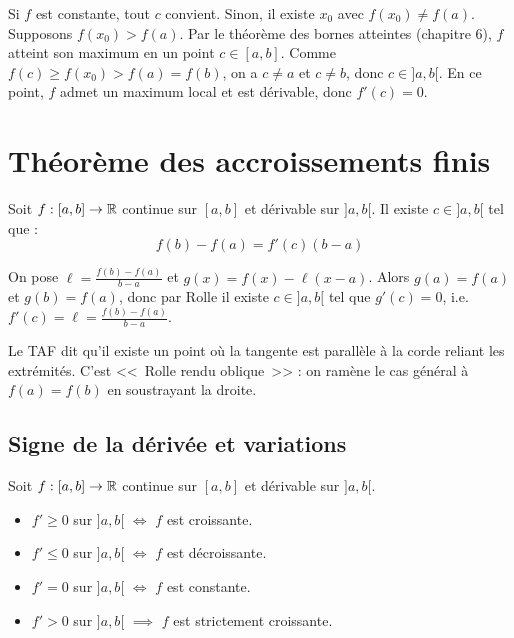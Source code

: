 \begin{proofbox}
Si $f$ est constante, tout $c$ convient. Sinon, il existe $x_0$ avec $f(x_0) \neq f(a)$. Supposons $f(x_0) > f(a)$. Par le théorème des bornes atteintes (chapitre 6), $f$ atteint son maximum en un point $c \in [a, b]$. Comme $f(c) \geqslant f(x_0) > f(a) = f(b)$, on a $c \neq a$ et $c \neq b$, donc $c \in ]a, b[$. En ce point, $f$ admet un maximum local et est dérivable, donc $f'(c) = 0$.
\end{proofbox}


\section{Théorème des accroissements finis}

\begin{thmbox}
Soit $f : [a, b] \to \mathbb{R}$ continue sur $[a, b]$ et dérivable sur $]a, b[$. Il existe $c \in ]a, b[$ tel que :
\[f(b) - f(a) = f'(c)(b - a)\]
\end{thmbox}

\begin{proofbox}
On pose $\ell = \frac{f(b) - f(a)}{b - a}$ et $g(x) = f(x) - \ell(x - a)$. Alors $g(a) = f(a)$ et $g(b) = f(a)$, donc par Rolle il existe $c \in ]a, b[$ tel que $g'(c) = 0$, i.e. $f'(c) = \ell = \frac{f(b) - f(a)}{b - a}$.
\end{proofbox}

\begin{intuitionbox}
Le TAF dit qu'il existe un point où la tangente est parallèle à la corde reliant les extrémités. C'est <<~Rolle rendu oblique~>> : on ramène le cas général à $f(a) = f(b)$ en soustrayant la droite.
\end{intuitionbox}

\subsection{Signe de la dérivée et variations}

\begin{corollaire}
Soit $f : [a, b] \to \mathbb{R}$ continue sur $[a, b]$ et dérivable sur $]a, b[$.
\begin{itemize}[leftmargin=1cm]
  \item $f' \geqslant 0$ sur $]a, b[$ $\iff$ $f$ est croissante.
  \item $f' \leqslant 0$ sur $]a, b[$ $\iff$ $f$ est décroissante.
  \item $f' = 0$ sur $]a, b[$ $\iff$ $f$ est constante.
  \item $f' > 0$ sur $]a, b[$ $\implies$ $f$ est strictement croissante.
\end{itemize}
\end{corollaire}

